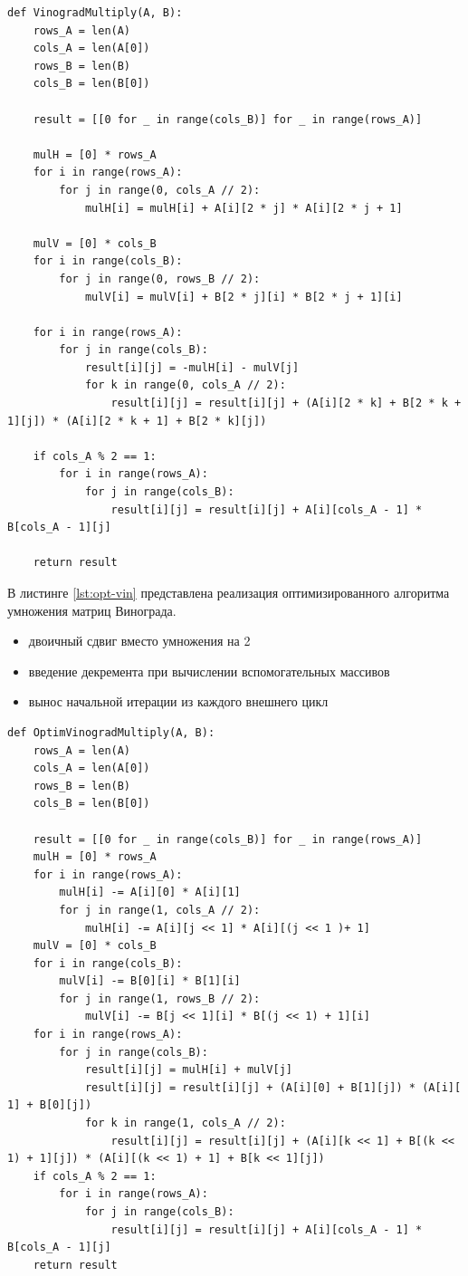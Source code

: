 \begin{lstlisting}[label=lst:vin,caption={Алгоритм умножения матриц Винограда}]
def VinogradMultiply(A, B):
    rows_A = len(A)
    cols_A = len(A[0])
    rows_B = len(B)
    cols_B = len(B[0])

    result = [[0 for _ in range(cols_B)] for _ in range(rows_A)]

    mulH = [0] * rows_A
    for i in range(rows_A):
        for j in range(0, cols_A // 2):
            mulH[i] = mulH[i] + A[i][2 * j] * A[i][2 * j + 1]

    mulV = [0] * cols_B
    for i in range(cols_B):
        for j in range(0, rows_B // 2):
            mulV[i] = mulV[i] + B[2 * j][i] * B[2 * j + 1][i]

    for i in range(rows_A):
        for j in range(cols_B):
            result[i][j] = -mulH[i] - mulV[j]
            for k in range(0, cols_A // 2):
                result[i][j] = result[i][j] + (A[i][2 * k] + B[2 * k + 1][j]) * (A[i][2 * k + 1] + B[2 * k][j])

    if cols_A % 2 == 1:
        for i in range(rows_A):
            for j in range(cols_B):
                result[i][j] = result[i][j] + A[i][cols_A - 1] * B[cols_A - 1][j]

    return result
\end{lstlisting}

\clearpage

В листинге \ref{lst:opt-vin} представлена реализация оптимизированного алгоритма умножения матриц Винограда.
\begin{itemize}
    \item двоичный сдвиг вместо умножения на 2
    \item введение декремента при вычислении вспомогательных массивов
    \item вынос начальной итерации из каждого внешнего цикл
\end{itemize}

\begin{lstlisting}[label=lst:opt-vin,caption={Алгоритм умножения матриц Винограда}]
def OptimVinogradMultiply(A, B):
    rows_A = len(A)
    cols_A = len(A[0])
    rows_B = len(B)
    cols_B = len(B[0])

    result = [[0 for _ in range(cols_B)] for _ in range(rows_A)]
    mulH = [0] * rows_A
    for i in range(rows_A):
        mulH[i] -= A[i][0] * A[i][1]
        for j in range(1, cols_A // 2):
            mulH[i] -= A[i][j << 1] * A[i][(j << 1 )+ 1]
    mulV = [0] * cols_B
    for i in range(cols_B):
        mulV[i] -= B[0][i] * B[1][i]
        for j in range(1, rows_B // 2):
            mulV[i] -= B[j << 1][i] * B[(j << 1) + 1][i]
    for i in range(rows_A):
        for j in range(cols_B):
            result[i][j] = mulH[i] + mulV[j]
            result[i][j] = result[i][j] + (A[i][0] + B[1][j]) * (A[i][ 1] + B[0][j])
            for k in range(1, cols_A // 2):
                result[i][j] = result[i][j] + (A[i][k << 1] + B[(k << 1) + 1][j]) * (A[i][(k << 1) + 1] + B[k << 1][j])
    if cols_A % 2 == 1:
        for i in range(rows_A):
            for j in range(cols_B):
                result[i][j] = result[i][j] + A[i][cols_A - 1] * B[cols_A - 1][j]
    return result
\end{lstlisting}

